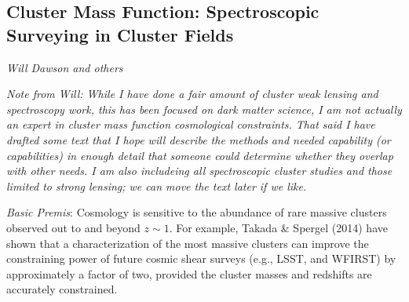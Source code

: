 \begin{enumerate}

\subsection{Cluster Mass Function: Spectroscopic Surveying in Cluster Fields}
\label{sec:sl:clusters}
{\it Will Dawson and others}

{\it Note from Will: While I have done a fair amount of cluster weak lensing and
spectroscopy work, this has been focused on dark matter science, I am not
actually an expert in cluster mass function cosmological constraints. That said
I have drafted some text that I hope will describe the methods and needed
capability (or capabilities) in enough detail that someone could determine
whether they overlap with other needs. I am also includeing all spectroscopic
cluster studies and those limited to strong lensing; we can move the text later
if we like.}

{\it Basic Premis}: Cosmology is sensitive to the abundance of rare massive
clusters observed out to and beyond $z\sim 1$. For example, Takada \& Spergel
(2014) have shown that a characterization of the most massive clusters can
improve the constraining power of future cosmic shear surveys (e.g., LSST, and
WFIRST) by approximately a factor of two, provided the cluster masses and
redshifts are accurately constrained.


\end{enumerate}
